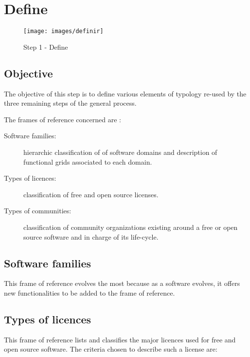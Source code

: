%
\section{Define}
\begin{figure}
\center
\texttt{[image: images/definir]}
\caption{Step 1 - Define}
\end{figure}


\subsection{Objective}
The objective of this step is to define various elements of typology re-used by the three 
remaining steps of the general process.


The frames of reference concerned are :
\begin{description}
\item [Software families:] hierarchic classification of of software domains and description of functional grids associated to each domain.
\item [Types of licences:] classification of free and open source licenses.
\item [Types of communities:] classification of community organizations existing around a free or open source software and in charge of its life-cycle.
\end{description}


\subsection{Software families}
This frame of reference evolves the most because as a software evolves, it
offers new functionalities to be added to the frame of reference.

\subsection{Types of licences}
This frame of reference lists and classifies the major licences used for free and open source software.
The criteria chosen to describe such a license are:

